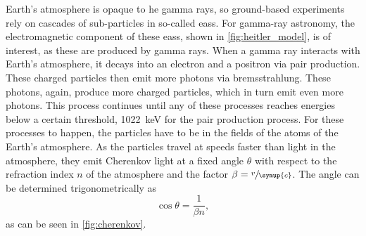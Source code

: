 Earth's atmosphere is opaque to \gls{he} gamma rays, so ground-based experiments rely on
cascades of sub-particles in so-called \glspl{eas}. For gamma-ray astronomy, the electromagnetic
component of these \glspl{eas}, shown in \autoref{fig:heitler_model}, is of interest, as these
are produced by gamma rays. When a gamma ray interacts with Earth's atmosphere, it decays into an
electron and a positron via pair production. These charged particles then emit more photons via
bremsstrahlung. These photons, again, produce more charged particles, which in turn emit even more
photons. This process continues until any of these processes reaches energies below a certain
threshold, \ie \SI{1022}{\kilo\eV} for the pair production process. For these processes to happen,
the particles have to be in the fields of the atoms of the Earth's atmosphere. As the particles
travel at speeds faster than light in the atmosphere, they emit Cherenkov light at
a fixed angle \(\theta\) with respect to the refraction index \(n\) of the atmosphere and the
factor \(\beta = \sfrac{v}{\symup{c}}\). The angle can be determined trigonometrically as
\begin{equation}
    \cos\theta = \frac{1}{\beta n},
\end{equation}
as can be seen in \autoref{fig:cherenkov}.

